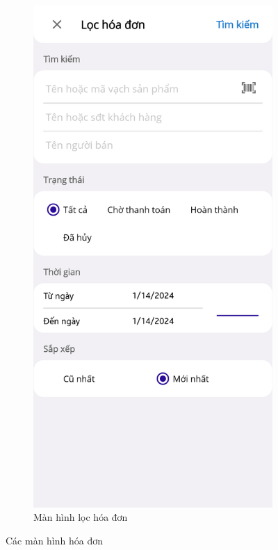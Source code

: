 \documentclass[../DoAn.tex]{subfiles}
\begin{document}
\begin{figure}[H]
    \begin{subfigure}{0.5\linewidth}
        \centering
        \includegraphics[width=0.9\linewidth]{Hinhve/design/screens/InvoiceFilterPage}
        \caption{Màn hình lọc hóa đơn}
        \label{figure:screen-invoicefilterpage}
    \end{subfigure}
    \caption{Các màn hình hóa đơn}
    \label{figure:screen-invoicepages1}
\end{figure}
\break
\end{document}
